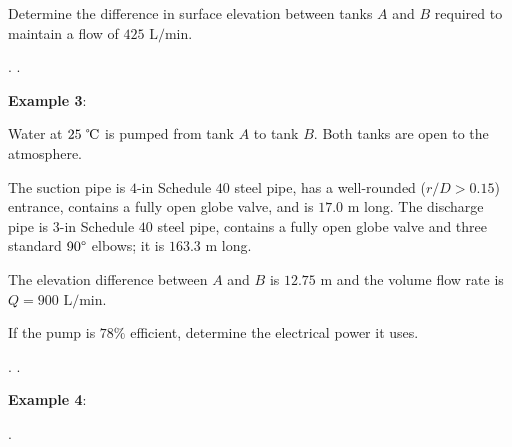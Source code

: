 \documentclass[10pt]{amsart}
\begin{document}
Determine the difference in surface elevation between tanks $A$
and $B$ required to maintain a flow of $425\text{ L/min}$.





\vfill
\newpage
.\newpage
.\newpage





\textbf{Example 3}:

Water at $25\text{ \textcelsius}$ is pumped from tank $A$ to tank $B$.
Both tanks are open to the atmosphere.

The suction pipe is $4\text{-in}$ Schedule $40$ steel pipe, has a well-rounded ($r/D>0.15$) entrance, contains a fully
open globe valve, and is $17.0\text{ m}$ long. The discharge pipe is $3\text{-in}$ Schedule $40$ steel pipe, contains a fully open globe valve and
three standard $90\degree$ elbows; it is $163.3\text{ m}$ long.

The elevation difference between $A$ and $B$ is $12.75\text{ m}$ and the volume flow rate is $Q=900\text{ L/min}$.

If the pump is $78\%$ efficient, determine the electrical power it uses.



\vfill
\newpage
.\newpage
.\newpage


\textbf{Example 4}:

\hfill
{}

\vfill

\newpage
.\newpage
\end{document}
